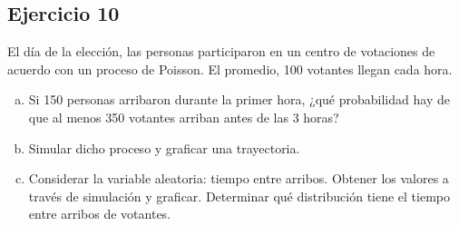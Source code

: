 \documentclass[12pt, a4paper]{article}
\begin{document}
\subsection*{Ejercicio 10}
 El día de la elección, las personas participaron en un centro de votaciones de acuerdo con un proceso de Poisson. El promedio,  100 votantes llegan cada hora. 
\begin{enumerate}[(a)]
	\item Si 150 personas arribaron durante la primer hora, ¿qué probabilidad hay de que al menos 350 votantes arriban antes de las 3 horas?
	\item Simular dicho proceso y graficar una trayectoria.
	\item Considerar la variable aleatoria: tiempo entre arribos. Obtener los valores a través de simulación y graficar. Determinar qué distribución tiene el tiempo entre arribos de votantes.

 \end{enumerate}
\end{document}
